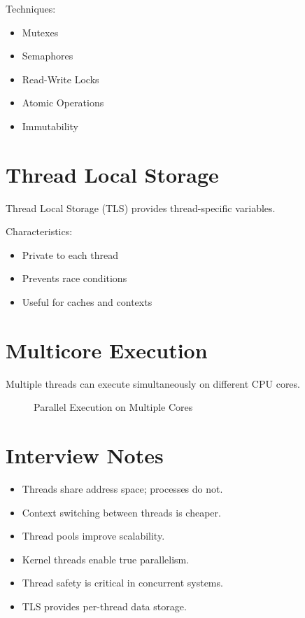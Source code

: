 Techniques:

\begin{itemize}
\item Mutexes
\item Semaphores
\item Read-Write Locks
\item Atomic Operations
\item Immutability
\end{itemize}

\section{Thread Local Storage}

Thread Local Storage (TLS) provides thread-specific variables.

Characteristics:

\begin{itemize}
\item Private to each thread
\item Prevents race conditions
\item Useful for caches and contexts
\end{itemize}

\section{Multicore Execution}

Multiple threads can execute simultaneously on different CPU cores.

\begin{figure}[H]
\centering
{}
\caption{Parallel Execution on Multiple Cores}
\end{figure}

\section{Interview Notes}

\begin{itemize}
\item Threads share address space; processes do not.
\item Context switching between threads is cheaper.
\item Thread pools improve scalability.
\item Kernel threads enable true parallelism.
\item Thread safety is critical in concurrent systems.
\item TLS provides per-thread data storage.
\end{itemize}

